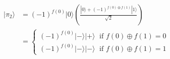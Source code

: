 \documentclass[preview]{standalone}
\begin{document}
\begin{align*}
|\pi_2\rangle &= (-1)^{f(0)}|0\rangle \left( \frac{|0\rangle + (-1)^{f(0)\oplus f(1)} |1\rangle}{\sqrt{2}}\right) \\ &=  \left\{ \begin{array}{ll}(-1)^{f(0)}|-\rangle |+\rangle \; \text{ if } f(0) \oplus f(1) = 0 \\(-1)^{f(0)} |-\rangle |-\rangle \; \text{ if } f(0) \oplus f(1) = 1 \end{array} \right.
\end{align*}
\end{document}
